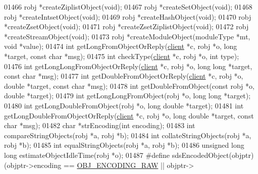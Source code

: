 \begin{DoxyCode}
{{{{{{{01466 robj *createZiplistObject(\textcolor{keywordtype}{void});
01467 robj *createSetObject(\textcolor{keywordtype}{void});
01468 robj *createIntsetObject(\textcolor{keywordtype}{void});
01469 robj *createHashObject(\textcolor{keywordtype}{void});
01470 robj *createZsetObject(\textcolor{keywordtype}{void});
01471 robj *createZsetZiplistObject(\textcolor{keywordtype}{void});
01472 robj *createStreamObject(\textcolor{keywordtype}{void});
01473 robj *createModuleObject(moduleType *mt, \textcolor{keywordtype}{void} *value);
01474 \textcolor{keywordtype}{int} getLongFromObjectOrReply(\hyperlink{structclient}{client} *c, robj *o, \textcolor{keywordtype}{long} *target, \textcolor{keyword}{const} \textcolor{keywordtype}{char} *msg);
01475 \textcolor{keywordtype}{int} checkType(\hyperlink{structclient}{client} *c, robj *o, \textcolor{keywordtype}{int} type);
01476 \textcolor{keywordtype}{int} getLongLongFromObjectOrReply(\hyperlink{structclient}{client} *c, robj *o, \textcolor{keywordtype}{long} \textcolor{keywordtype}{long} *target, \textcolor{keyword}{const} \textcolor{keywordtype}{char} *msg);
01477 \textcolor{keywordtype}{int} getDoubleFromObjectOrReply(\hyperlink{structclient}{client} *c, robj *o, \textcolor{keywordtype}{double} *target, \textcolor{keyword}{const} \textcolor{keywordtype}{char} *msg);
01478 \textcolor{keywordtype}{int} getDoubleFromObject(\textcolor{keyword}{const} robj *o, \textcolor{keywordtype}{double} *target);
01479 \textcolor{keywordtype}{int} getLongLongFromObject(robj *o, \textcolor{keywordtype}{long} \textcolor{keywordtype}{long} *target);
01480 \textcolor{keywordtype}{int} getLongDoubleFromObject(robj *o, \textcolor{keywordtype}{long} \textcolor{keywordtype}{double} *target);
01481 \textcolor{keywordtype}{int} getLongDoubleFromObjectOrReply(\hyperlink{structclient}{client} *c, robj *o, \textcolor{keywordtype}{long} \textcolor{keywordtype}{double} *target, \textcolor{keyword}{const} \textcolor{keywordtype}{char} *msg);
01482 \textcolor{keywordtype}{char} *strEncoding(\textcolor{keywordtype}{int} encoding);
01483 \textcolor{keywordtype}{int} compareStringObjects(robj *a, robj *b);
01484 \textcolor{keywordtype}{int} collateStringObjects(robj *a, robj *b);
01485 \textcolor{keywordtype}{int} equalStringObjects(robj *a, robj *b);
01486 \textcolor{keywordtype}{unsigned} \textcolor{keywordtype}{long} \textcolor{keywordtype}{long} estimateObjectIdleTime(robj *o);
01487 \textcolor{preprocessor}{#}\textcolor{preprocessor}{define} \textcolor{preprocessor}{sdsEncodedObject}\textcolor{preprocessor}{(}\textcolor{preprocessor}{objptr}\textcolor{preprocessor}{)} \textcolor{preprocessor}{(}\textcolor{preprocessor}{objptr}\textcolor{preprocessor}{->}\textcolor{preprocessor}{encoding} \textcolor{preprocessor}{==} \hyperlink{server_8h_a148bc85e3074e324a6dc5eebcad1bcd5}{OBJ\_ENCODING\_RAW} \textcolor{preprocessor}{||} \textcolor{preprocessor}{objptr}\textcolor{preprocessor}{->}\textcolor{preprocessor}{
}}}}}}}}
\end{DoxyCode}
